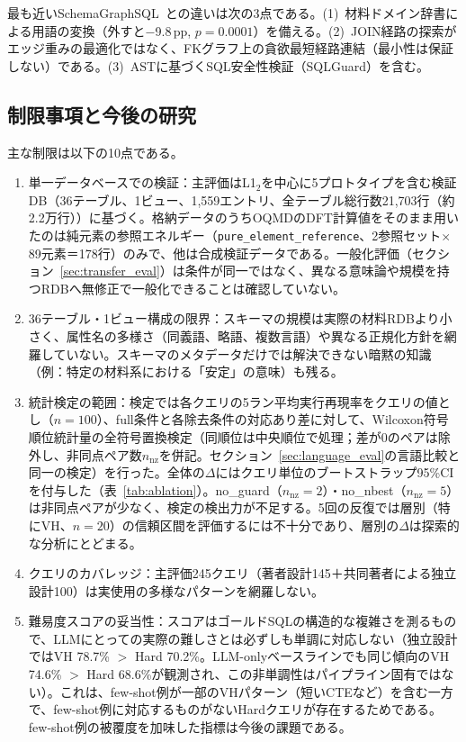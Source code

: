 \documentclass[twocolumn]{interact}
\begin{document}
最も近いSchemaGraphSQL~\cite{safdarian2026schemagraphsql}との違いは次の3点である。(1)~材料ドメイン辞書による用語の変換（外すと$-$9.8\,pp, $p=0.0001$）を備える。(2)~JOIN経路の探索がエッジ重みの最適化ではなく、FKグラフ上の貪欲最短経路連結（最小性は保証しない）である。(3)~ASTに基づくSQL安全性検証（SQLGuard）を含む。

\subsection{制限事項と今後の研究}

主な制限は以下の10点である。
\begin{enumerate}[nosep]
  \item 単一データベースでの検証：主評価はL1$_2$を中心に5プロトタイプを含む検証DB（36テーブル、1ビュー、1{,}559エントリ、全テーブル総行数21{,}703行（約2.2万行））に基づく。格納データのうちOQMDのDFT計算値をそのまま用いたのは純元素の参照エネルギー（\texttt{pure\_element\_reference}、2参照セット$\times$89元素＝178行）のみで、他は合成検証データである。一般化評価（セクション~\ref{sec:transfer_eval}）は条件が同一ではなく、異なる意味論や規模を持つRDBへ無修正で一般化できることは確認していない。
  \item 36テーブル・1ビュー構成の限界：スキーマの規模は実際の材料RDBより小さく、属性名の多様さ（同義語、略語、複数言語）や異なる正規化方針を網羅していない。スキーマのメタデータだけでは解決できない暗黙の知識（例：特定の材料系における「安定」の意味）も残る。
  \item 統計検定の範囲：検定では各クエリの5ラン平均実行再現率をクエリの値とし（$n=100$）、full条件と各除去条件の対応あり差に対して、Wilcoxon符号順位統計量の全符号置換検定（同順位は中央順位で処理；差が0のペアは除外し、非同点ペア数$n_\mathrm{nz}$を併記。セクション~\ref{sec:language_eval}の言語比較と同一の検定）を行った。全体の$\Delta$にはクエリ単位のブートストラップ95\%CIを付与した（表~\ref{tab:ablation}）。no\_guard（$n_\mathrm{nz}=2$）・no\_nbest（$n_\mathrm{nz}=5$）は非同点ペアが少なく、検定の検出力が不足する。5回の反復では層別（特にVH、$n=20$）の信頼区間を評価するには不十分であり、層別の$\Delta$は探索的な分析にとどまる。
  \item クエリのカバレッジ：主評価245クエリ（著者設計145＋共同著者による独立設計100）は実使用の多様なパターンを網羅しない。
  \item 難易度スコアの妥当性：スコアはゴールドSQLの構造的な複雑さを測るもので、LLMにとっての実際の難しさとは必ずしも単調に対応しない（独立設計ではVH 78.7\% $>$ Hard 70.2\%。LLM-onlyベースラインでも同じ傾向のVH 74.6\% $>$ Hard 68.6\%が観測され、この非単調性はパイプライン固有ではない）。これは、few-shot例が一部のVHパターン（短いCTEなど）を含む一方で、few-shot例に対応するものがないHardクエリが存在するためである。few-shot例の被覆度を加味した指標は今後の課題である。

\end{enumerate}
\end{document}
